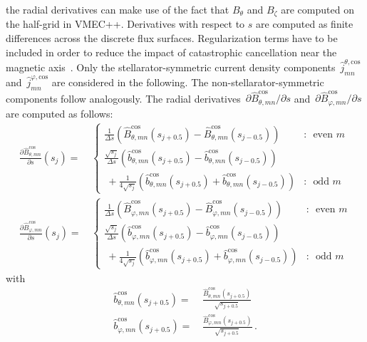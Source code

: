 the radial derivatives can make use of the fact that $B_\theta$ and $B_\zeta$
are computed on the half-grid in VMEC++.
%
Derivatives with respect to $s$ are computed as finite differences across the discrete flux surfaces.
%
Regularization terms have to be included in order to
reduce the impact of catastrophic cancellation near the magnetic axis~\cite{hirshman_vmec_currents}.
%
Only the stellarator-symmetric current density components~$\hat{j}_{mn}^{\theta, \mathrm{cos}}$
and~$\hat{j}_{mn}^{\varphi,  \mathrm{cos}}$ are considered in the following.
%
The non-stellarator-symmetric components follow analogously.
%
The radial derivatives~$\partial \hat{B}_{\theta, mn}^\mathrm{cos} / \partial s$
and~$\partial \hat{B}_{\varphi, mn}^\mathrm{cos} / \partial s$ are computed as follows:
\begin{align}
\frac{\partial \hat{B}_{\theta, mn}^\mathrm{cos}}{\partial s} (s_j)
 =&\, \begin{cases}
        \frac{1}{\Delta s} \left( \hat{B}_{\theta, mn}^\mathrm{cos}(s_{j+0.5}) - \hat{B}_{\theta, mn}^\mathrm{cos}(s_{j-0.5}) \right) &:\, \textrm{ even } m \\
        \frac{\sqrt{s_j}}{\Delta s} \left(
            \hat{b}_{\theta, mn}^\mathrm{cos}(s_{j+0.5})
          - \hat{b}_{\theta, mn}^\mathrm{cos}(s_{j-0.5}) \right) \\
        ~ + \frac{1}{4 \sqrt{s_j}} \left(
              \hat{b}_{\theta, mn}^\mathrm{cos}(s_{j+0.5})
            + \hat{b}_{\theta, mn}^\mathrm{cos}(s_{j-0.5}) \right)
          &:\, \textrm{ odd } m
      \end{cases} \\
 \frac{\partial \hat{B}_{\varphi, mn}^\mathrm{cos}}{\partial s} (s_j)
 =&\, \begin{cases}
        \frac{1}{\Delta s} \left( \hat{B}_{\varphi, mn}^\mathrm{cos}(s_{j+0.5}) - \hat{B}_{\varphi, mn}^\mathrm{cos}(s_{j-0.5}) \right) &:\, \textrm{ even } m \\
        \frac{\sqrt{s_j}}{\Delta s} \left(
            \hat{b}_{\varphi, mn}^\mathrm{cos}(s_{j+0.5})
          - \hat{b}_{\varphi, mn}^\mathrm{cos}(s_{j-0.5}) \right) \\
        ~ + \frac{1}{4 \sqrt{s_j}} \left(
              \hat{b}_{\varphi, mn}^\mathrm{cos}(s_{j+0.5})
            + \hat{b}_{\varphi, mn}^\mathrm{cos}(s_{j-0.5}) \right)
          &:\, \textrm{ odd } m
      \end{cases}
\end{align}
with
\begin{align}
 \hat{b}_{\theta, mn}^\mathrm{cos}(s_{j+0.5}) =&\, \frac{\hat{B}_{\theta, mn}^\mathrm{cos}(s_{j+0.5})}{\sqrt{s_{j+0.5}}} \\
 \hat{b}_{\varphi, mn}^\mathrm{cos}(s_{j+0.5}) =&\, \frac{\hat{B}_{\varphi, mn}^\mathrm{cos}(s_{j+0.5})}{\sqrt{s_{j+0.5}}} \, .
\end{align}
